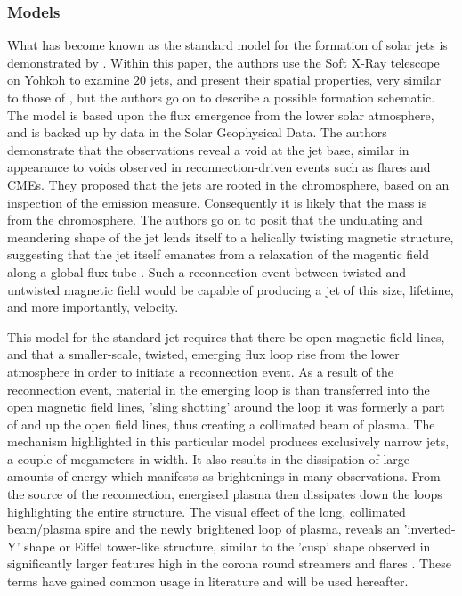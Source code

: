 \subsubsection{Models}
What has become known as the standard model for the formation of solar jets is demonstrated  by \cite{Shibata1992}.
Within this paper, the authors use the Soft X-Ray telescope on Yohkoh to examine $20$ jets, and present their spatial properties, very similar to those of \cite{Shimojo1996}, but the authors go on to describe a possible formation schematic.
The model is based upon the flux emergence from the lower solar atmosphere, and is backed up by data in the Solar Geophysical Data.
The authors demonstrate that the observations reveal a void at the jet base, similar in appearance to voids observed in reconnection-driven events such as flares and CMEs.
They proposed that the jets are rooted in the chromosphere, based on an inspection of the emission measure.
Consequently it is likely that the mass is from the chromosphere.
The authors go on to posit that the undulating and meandering shape of the jet lends itself to a helically twisting magnetic structure, suggesting that the jet itself emanates from a relaxation of the magentic field along a global flux tube \cite{Shibata1986}.
Such a reconnection event between twisted and untwisted magnetic field would be capable of producing a jet of this size, lifetime, and more importantly, velocity.

This model for the standard jet requires that there be open magnetic field lines, and that a smaller-scale, twisted, emerging flux loop rise from the lower atmosphere in order to initiate a reconnection event.
As a result of the reconnection event, material in the emerging loop is than transferred into the open magnetic field lines, 'sling shotting' around the loop it was formerly a part of and up the open field lines, thus creating a collimated beam of plasma.
The mechanism highlighted in this particular model produces exclusively narrow jets, a couple of megameters in width.
It also results in the dissipation of large amounts of energy which manifests as brightenings in many observations.
From the source of the reconnection, energised plasma then dissipates down the loops highlighting the entire structure.
The visual effect of the long, collimated beam/plasma spire and the newly brightened loop of plasma, reveals an 'inverted-Y' shape or Eiffel tower-like structure, similar to the 'cusp' shape observed in significantly larger features high in the corona round streamers and flares \cite{Vourlidas2006}.
These terms have gained common usage in literature and will be used hereafter. 

